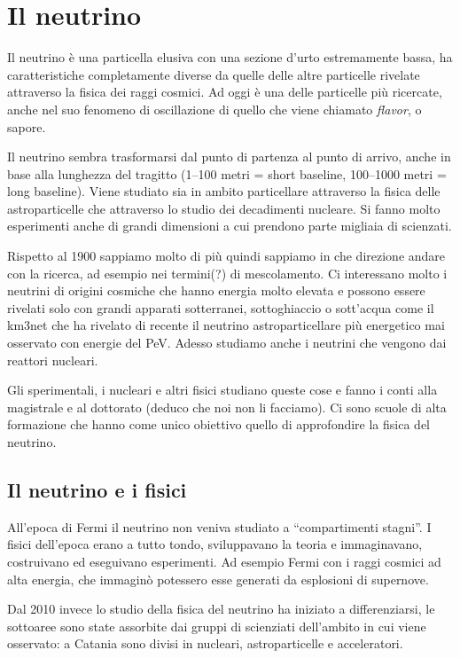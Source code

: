     \section{Il neutrino}
        Il neutrino è una particella elusiva con una sezione d'urto estremamente bassa, ha caratteristiche completamente diverse da quelle delle altre particelle rivelate attraverso la fisica dei raggi cosmici. Ad oggi è una delle particelle più ricercate, anche nel suo fenomeno di oscillazione di quello che viene chiamato \emph{flavor}, o sapore.

        Il neutrino sembra trasformarsi dal punto di partenza al punto di arrivo, anche in base alla lunghezza del tragitto (1--100 metri = short baseline, 100--1000 metri = long baseline). Viene studiato sia in ambito particellare attraverso la fisica delle astroparticelle che attraverso lo studio dei decadimenti nucleare. Si fanno molto esperimenti anche di grandi dimensioni a cui prendono parte migliaia di scienzati.

        Rispetto al 1900 sappiamo molto di più quindi sappiamo in che direzione andare con la ricerca, ad esempio nei termini(?) di mescolamento. Ci interessano molto i neutrini di origini cosmiche che hanno energia molto elevata e possono essere rivelati solo con grandi apparati sotterranei, sottoghiaccio o sott'acqua come il km3net che ha rivelato di recente il neutrino astroparticellare più energetico mai osservato con energie del PeV. Adesso studiamo anche i neutrini che vengono dai reattori nucleari.
        
        Gli sperimentali, i nucleari e altri fisici studiano queste cose e fanno i conti alla magistrale e al dottorato (deduco che noi non li facciamo). Ci sono scuole di alta formazione che hanno come unico obiettivo quello di approfondire la fisica del neutrino.

    \subsection{Il neutrino e i fisici}
        All'epoca di Fermi il neutrino non veniva studiato a ``compartimenti stagni''. I fisici dell'epoca erano a tutto tondo, sviluppavano la teoria e immaginavano, costruivano ed eseguivano esperimenti. Ad esempio Fermi con i raggi cosmici ad alta energia, che immaginò potessero esse generati da esplosioni di supernove.

        Dal 2010 invece lo studio della fisica del neutrino ha iniziato a differenziarsi, le sottoaree sono state assorbite dai gruppi di scienziati dell'ambito in cui viene osservato: a Catania sono divisi in nucleari, astroparticelle e acceleratori.

